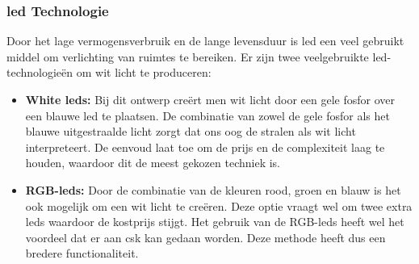 		\subsubsection{\gls{led} Technologie}
		Door het lage vermogensverbruik en de lange levensduur is \gls{led} een veel gebruikt middel om verlichting van ruimtes te bereiken. Er zijn twee veelgebruikte \gls{led}-technologie\"en om wit licht te produceren: 
			\begin{itemize}
				\item \textbf{White \glspl{led}:} Bij dit ontwerp cre\"ert men wit licht door een gele fosfor over een blauwe \gls{led} te plaatsen. De combinatie van zowel de gele fosfor als het blauwe uitgestraalde licht zorgt dat ons oog de stralen als wit licht interpreteert. De eenvoud laat toe om de prijs en de complexiteit laag te houden, waardoor dit de meest gekozen techniek is.
				
				\item \textbf{RGB-\glspl{led}:} Door de combinatie van de kleuren rood, groen en blauw is het ook mogelijk om een wit licht te cre\"eren. Deze optie vraagt wel om twee extra \glspl{led} waardoor de kostprijs stijgt. Het gebruik van de RGB-\glspl{led} heeft wel het voordeel dat er aan \gls{csk} kan gedaan worden. Deze methode heeft dus een bredere functionaliteit.
			\end{itemize}
